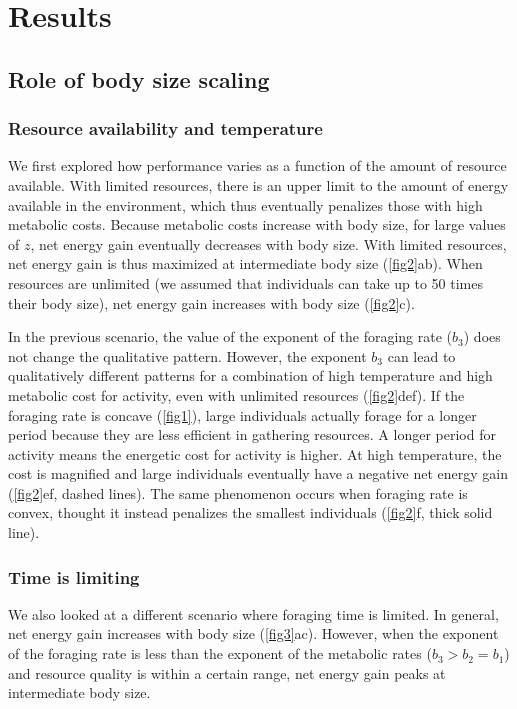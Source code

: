 \section*{Results}
\subsection*{Role of body size scaling}
\subsubsection*{Resource availability and temperature}
We first explored how performance varies as a function of the amount of resource available.
With limited resources,  there is an upper limit to the amount of energy available in the environment, which thus eventually penalizes those with high metabolic costs.
Because metabolic costs increase with  body size, for large values of $z$, net energy gain eventually decreases with body size. 
With limited resources, net energy gain is thus maximized at intermediate body size (\cref{fig2}ab). 
 When resources are unlimited (we assumed that individuals can take up to 50 times their body size), net energy gain increases with body size (\cref{fig2}c).

In the previous scenario, the value of the exponent of the foraging rate ($b_3$) does not change the qualitative pattern. %
However,  the exponent $b_3$ can lead to qualitatively different patterns  for a combination of high temperature and high metabolic cost for activity, even with unlimited resources (\cref{fig2}def).
If the foraging rate is concave (\cref{fig1}), large individuals actually forage for a longer period because they are less efficient in gathering resources.
A longer period for  activity means the energetic cost for activity is higher.
At high temperature, the cost is magnified and  large individuals eventually have a negative net energy gain (\cref{fig2}ef, dashed lines).
The same phenomenon occurs when foraging rate is convex, thought it instead penalizes the smallest individuals (\cref{fig2}f, thick solid line).
\subsubsection*{Time is limiting}
We also looked at a different scenario where foraging time is limited.
In general, net energy gain increases with body size (\cref{fig3}ac).
However, when the exponent of the foraging rate is less than the exponent of the metabolic rates ($b_3 > b_2 = b_1$) and resource quality is within a certain range,  net energy gain peaks at intermediate body size.

